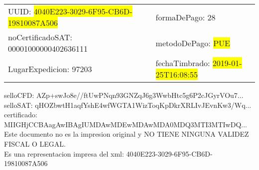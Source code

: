 \documentclass{article}
\begin{document}
\begin{tabular}{p{11cm}p{1cm}p{8cm}}
\bigskip
UUID: \colorbox{yellow}{ 4040E223-3029-6F95-CB6D-19810087A506 } & & formaDePago: 28\\

noCertificadoSAT: 00001000000402636111 & & metodoDePago: \colorbox{yellow}{ PUE }\\

LugarExpedicion: 97203 & & fechaTimbrado: \colorbox{yellow}{ 2019-01-25T16:08:55 } \\
\end{tabular}

\bigskip
selloCFD: AZp+swJo8e//ftUwPNqn93GNZqJ6g3WwbHtc5g6P2cJGyrVOu7... \\
selloSAT: qHOZbwtH1aqfYshE4wfWGTA1WizToqKpDkrXRLIvJEvnKw3/Wq... \\

certificado: MIIGHjCCBAagAwIBAgIUMDAwMDEwMDAwMDA0MDQ3MTI3MTIwDQ...\bigskip\bigskip\bigskip\bigskip\bigskip\bigskip
\\Este documento no es la impresion original y NO TIENE NINGUNA VALIDEZ FISCAL O LEGAL. \\
 Es una representacion impresa del xml:  4040E223-3029-6F95-CB6D-19810087A506 \\
\end{document}
